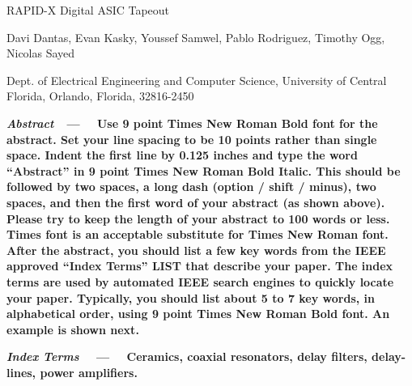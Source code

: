\documentclass[12pt]{article}
\begin{document}
\pagestyle{empty}

\begin{multicols}{2}
\setlength{\columnsep}{0.5cm}

\begin{center}
    {\fontsize{18pt}{22pt}\selectfont RAPID-X Digital ASIC Tapeout\par}


    {\selectfont Davi Dantas, Evan Kasky, Youssef Samwel, Pablo Rodriguez, Timothy Ogg, Nicolas Sayed\par}
    
    {\selectfont Dept. of Electrical Engineering and Computer Science, University of Central Florida, Orlando, Florida, 32816-2450\par}
    
\end{center}

\vspace{1em}

{\fontsize{9pt}{10pt}\selectfont
\setlength{\parindent}{0.125in}
\textbf{\textit{Abstract}\ \ --- \ \ Use 9 point Times New Roman Bold font for the abstract. Set your line spacing to be 10 points rather than single space. Indent the first line by 0.125 inches and type the word “Abstract” in 9 point Times New Roman Bold Italic. This should be followed by two spaces, a long dash (option / shift / minus), two spaces, and then the first word of your abstract (as shown above). Please try to keep the length of your abstract to 100 words or less. Times font is an acceptable substitute for Times New Roman font. After the abstract, you should list a few key words from the IEEE approved “Index Terms” LIST that describe your paper. The index terms are used by automated IEEE search engines to quickly locate your paper. Typically, you should list about 5 to 7 key words, in alphabetical order, using 9 point Times New Roman Bold font. An example is shown next.}

\vspace{0pt}

\textbf{ \textit{Index Terms} \ \ --- \ \ Ceramics, coaxial resonators, delay filters, delay-lines, power amplifiers. }

}

\vspace{1em}


\end{multicols}
\end{document}
